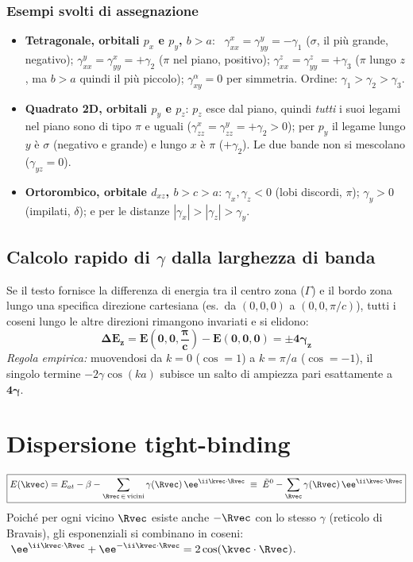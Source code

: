 \subsubsection*{Esempi svolti di assegnazione}
\begin{itemize}
\item \textbf{Tetragonale, orbitali $p_x$ e $p_y$, $b>a$}: \
$\gamma^x_{xx}=\gamma^y_{yy}=-\gamma_1$ ($\sigma$, il più grande, negativo);
$\gamma^y_{xx}=\gamma^x_{yy}=+\gamma_2$ ($\pi$ nel piano, positivo);
$\gamma^z_{xx}=\gamma^z_{yy}=+\gamma_3$ ($\pi$ lungo $z$, ma $b>a$ quindi il più piccolo);
$\gamma_{xy}^\alpha = 0$ per simmetria. Ordine: $\gamma_1>\gamma_2>\gamma_3$.
\item \textbf{Quadrato 2D, orbitali $p_y$ e $p_z$}: $p_z$ esce dal piano, quindi \emph{tutti} i suoi legami nel piano sono di tipo $\pi$ e uguali ($\gamma^x_{zz}=\gamma^y_{zz}=+\gamma_2>0$); per $p_y$ il legame lungo $y$ è $\sigma$ (negativo e grande) e lungo $x$ è $\pi$ ($+\gamma_2$). Le due bande non si mescolano ($\gamma_{yz}=0$).
\item \textbf{Ortorombico, orbitale $d_{xz}$, $b>c>a$}: $\gamma_x,\gamma_z<0$ (lobi discordi, $\pi$); $\gamma_y>0$ (impilati, $\delta$); e per le distanze $|\gamma_x|>|\gamma_z|>\gamma_y$.
\end{itemize}

\subsection{Calcolo rapido di $\gamma$ dalla larghezza di banda}
Se il testo fornisce la differenza di energia tra il centro zona ($\Gamma$) e il bordo zona lungo una specifica direzione cartesiana (es.\ da $(0,0,0)$ a $(0,0,\pi/c)$), tutti i coseni lungo le altre direzioni rimangono invariati e si elidono:
\[ \bm{\Delta E_z = E\!\left(0,0,\frac{\pi}{c}\right) - E(0,0,0) = \pm 4\gamma_z} \]
\textit{Regola empirica:} muovendosi da $k=0$ ($\cos=1$) a $k=\pi/a$ ($\cos=-1$), il singolo termine $-2\gamma\cos(ka)$ subisce un salto di ampiezza pari esattamente a $\mathbf{4\gamma}$.

\newpage
\section{Dispersione tight-binding}

\[ \boxed{E(\kvec) = E_{at} - \beta - \sum_{\Rvec\,\in\,\text{vicini}} \gamma(\Rvec)\,\ee^{\ii\kvec\cdot\Rvec}
   \;\equiv\; \tilde E^0 - \sum_{\Rvec}\gamma(\Rvec)\,\ee^{\ii\kvec\cdot\Rvec}} \]
Poiché per ogni vicino $\Rvec$ esiste anche $-\Rvec$ con lo stesso $\gamma$ (reticolo di Bravais), gli esponenziali si combinano in coseni:
$\ \ee^{\ii\kvec\cdot\Rvec}+\ee^{-\ii\kvec\cdot\Rvec} = 2\cos(\kvec\cdot\Rvec)$.

